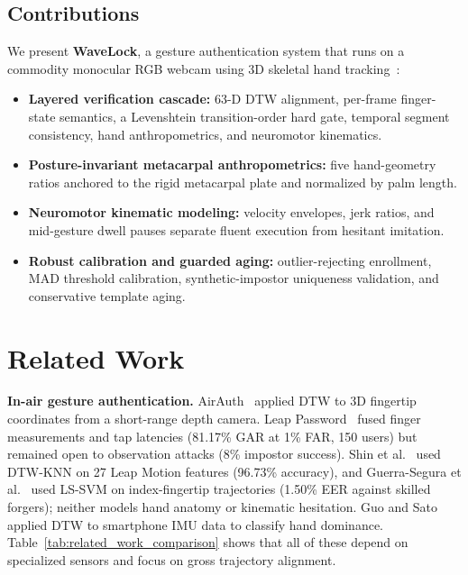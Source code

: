 \documentclass[conference]{IEEEtran}
\begin{document}
\subsection{Contributions}
We present \textbf{WaveLock}, a gesture authentication system that runs on a commodity monocular RGB webcam using 3D skeletal hand tracking~\cite{mediapipe}:
\begin{itemize}
\item \textbf{Layered verification cascade:} 63-D DTW alignment, per-frame finger-state semantics, a Levenshtein transition-order hard gate, temporal segment consistency, hand anthropometrics, and neuromotor kinematics.
\item \textbf{Posture-invariant metacarpal anthropometrics:} five hand-geometry ratios anchored to the rigid metacarpal plate and normalized by palm length.
\item \textbf{Neuromotor kinematic modeling:} velocity envelopes, jerk ratios, and mid-gesture dwell pauses separate fluent execution from hesitant imitation.
\item \textbf{Robust calibration and guarded aging:} outlier-rejecting enrollment, MAD threshold calibration, synthetic-impostor uniqueness validation, and conservative template aging.
\end{itemize}


\section{Related Work}
\label{sec:related_work}

\textbf{In-air gesture authentication.} AirAuth~\cite{airauth} applied DTW to 3D fingertip coordinates from a short-range depth camera. Leap Password~\cite{leappassword} fused finger measurements and tap latencies (81.17\% GAR at 1\% FAR, 150 users) but remained open to observation attacks (8\% impostor success). Shin et al.~\cite{dtwknn} used DTW-KNN on 27 Leap Motion features (96.73\% accuracy), and Guerra-Segura et al.~\cite{inairsig} used LS-SVM on index-fingertip trajectories (1.50\% EER against skilled forgers); neither models hand anatomy or kinematic hesitation. Guo and Sato~\cite{traceablesig} applied DTW to smartphone IMU data to classify hand dominance. Table~\ref{tab:related_work_comparison} shows that all of these depend on specialized sensors and focus on gross trajectory alignment.
\end{document}
